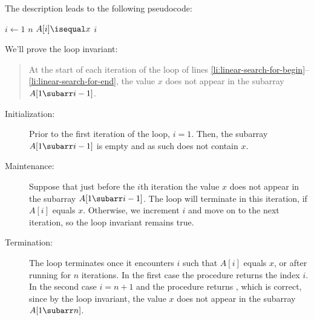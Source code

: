 The description leads to the following pseudocode:

\begin{codebox}
\li \For $i\gets1$ \To $n$ \label{li:linear-search-for-begin}
\li     \Do \If $A[i]\isequal x$
\li         \Then \Return $i$
            \End
        \End \label{li:linear-search-for-end}
\li \Return \nil
\end{codebox}

We'll prove the loop invariant:
\begin{quote}
    At the start of each iteration of the  loop of lines \ref{li:linear-search-for-begin}--\ref{li:linear-search-for-end}, the value $x$ does not appear in the subarray $A[1\subarr i-1]$.
\end{quote}

\begin{description}
    \item[Initialization:] Prior to the first iteration of the loop, $i=1$.
    Then, the subarray $A[1\subarr i-1]$ is empty and as such does not contain $x$.
    \item[Maintenance:] Suppose that just before the $i$th iteration the value $x$ does not appear in the subarray $A[1\subarr i-1]$.
    The loop will terminate in this iteration, if $A[i]$ equals $x$.
    Otherwise, we increment $i$ and move on to the next iteration, so the loop invariant remains true.
    \item[Termination:] The loop terminates once it encounters $i$ such that $A[i]$ equals $x$, or after running for $n$ iterations.
    In the first case the procedure returns the index $i$.
    In the second case $i=n+1$ and the procedure returns \nil, which is correct, since by the loop invariant, the value $x$ does not appear in the subarray $A[1\subarr n]$.
\end{description}
